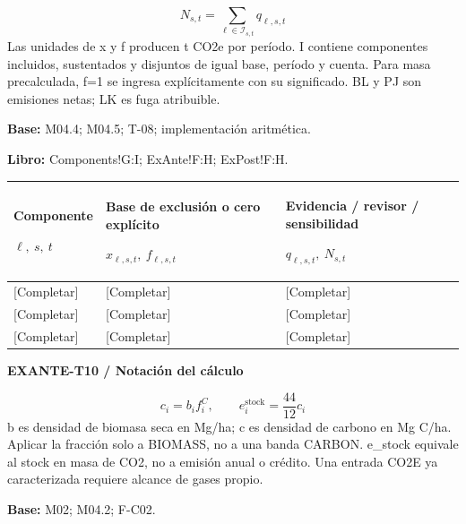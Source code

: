 {\fontsize{9}{11}\selectfont\[ N_{s,t}=\sum_{\ell\in\mathcal I_{s,t}}q_{\ell,s,t} \]}
Las unidades de x y f producen t CO2e por período. I contiene componentes incluidos, sustentados y disjuntos de igual base, período y cuenta. Para masa precalculada, f=1 se ingresa explícitamente con su significado. BL y PJ son emisiones netas; LK es fuga atribuible.\par
\textbf{Base:} M04.4; M04.5; T-08; implementación aritmética.\par
\textbf{Libro:} Components!G:I; ExAnte!F:H; ExPost!F:H.\par\endgroup
{\sffamily\fontsize{8.3}{10.3}\selectfont\begin{longtable}{@{}P{54.83mm} P{54.83mm} P{54.83mm}@{}}
\toprule
\textbf{Componente}\par {\normalfont\fontsize{8.2}{10}\selectfont $\ell,\ s,\ t$} & \textbf{Base de exclusión o cero explícito}\par {\normalfont\fontsize{8.2}{10}\selectfont $x_{\ell,s,t},\ f_{\ell,s,t}$} & \textbf{Evidencia / revisor / sensibilidad}\par {\normalfont\fontsize{8.2}{10}\selectfont $q_{\ell,s,t},\ N_{s,t}$}\\\midrule\endhead
\rule{0pt}{8mm}[Completar] & [Completar] & [Completar]\\\hline
\rule{0pt}{8mm}[Completar] & [Completar] & [Completar]\\\hline
\rule{0pt}{8mm}[Completar] & [Completar] & [Completar]\\\hline
\end{longtable}}
\par\begingroup\sffamily\fontsize{8}{10}\selectfont\color{NEBGreen}\setlength{\parskip}{2pt}\setlength{\abovedisplayskip}{4pt}\setlength{\belowdisplayskip}{4pt}\setlength{\abovedisplayshortskip}{2pt}\setlength{\belowdisplayshortskip}{3pt}
\textbf{EXANTE-T10 / Notación del cálculo}\par
{\fontsize{9}{11}\selectfont\[ c_i=b_i f_i^C,\qquad e_i^{\mathrm{stock}}=\frac{44}{12}c_i \]}
b es densidad de biomasa seca en Mg/ha; c es densidad de carbono en Mg C/ha. Aplicar la fracción solo a BIOMASS, no a una banda CARBON. e\_stock equivale al stock en masa de CO2, no a emisión anual o crédito. Una entrada CO2E ya caracterizada requiere alcance de gases propio.\par
\textbf{Base:} M02; M04.2; F-C02.\par
